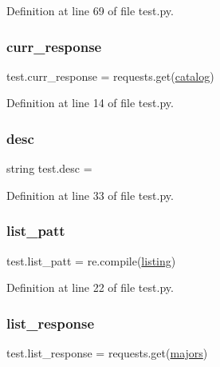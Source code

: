 Definition at line 69 of file test.\+py.

\mbox{\label{namespacetest_aebc4c0e0da8bb665062857db50b59f27}} 
\subsubsection{\texorpdfstring{curr\+\_\+response}{curr\_response}}
{\footnotesize\ttfamily test.\+curr\+\_\+response = requests.\+get(\mbox{\hyperlink{namespacetest_a558bb89ee60dd0d0cdc82c89fd7db764}{catalog}})}



Definition at line 14 of file test.\+py.

\mbox{\label{namespacetest_a07d6347d922b6f2fe5cfdd79f0a8ec7c}} 
\subsubsection{\texorpdfstring{desc}{desc}}
{\footnotesize\ttfamily string test.\+desc = \textquotesingle{}\textquotesingle{}}



Definition at line 33 of file test.\+py.

\mbox{\label{namespacetest_a2463c97fe84ef96959bb4270464142e8}} 
\subsubsection{\texorpdfstring{list\+\_\+patt}{list\_patt}}
{\footnotesize\ttfamily test.\+list\+\_\+patt = re.\+compile(\mbox{\hyperlink{namespacetest_aa935a14b351dde1a77f8a9fdf62ab9e4}{listing}})}



Definition at line 22 of file test.\+py.

\mbox{\label{namespacetest_a8b6b8ae2b5255348f5053214f923315a}} 
\subsubsection{\texorpdfstring{list\+\_\+response}{list\_response}}
{\footnotesize\ttfamily test.\+list\+\_\+response = requests.\+get(\mbox{\hyperlink{namespacetest_aac866171a3a2f476bc4ee9c246332d20}{majors}})}



